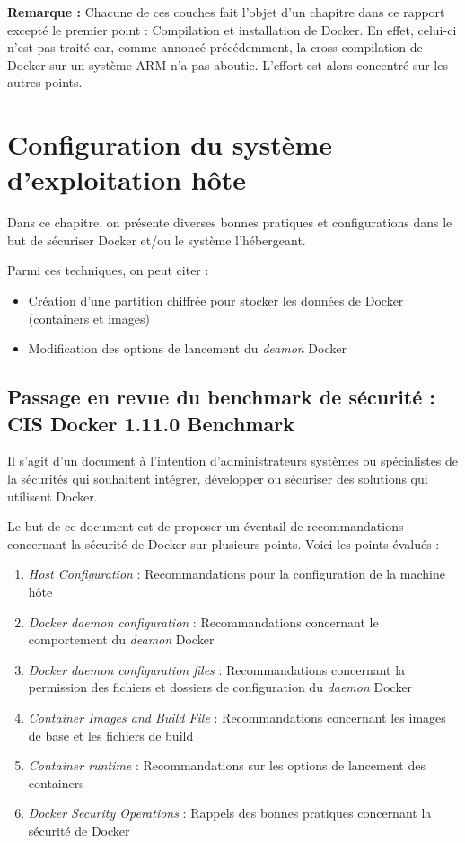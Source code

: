 \documentclass[11pt,a4paper,oneside]{report}
\begin{document}
\textbf{Remarque : } Chacune de ces couches fait l'objet d'un chapitre dans ce rapport excepté le premier point : Compilation et installation de Docker. En effet, celui-ci n'est pas traité car, comme annoncé précédemment, la cross compilation de Docker sur un système ARM n'a pas aboutie. L'effort est alors concentré sur les autres points.


\chapter{Configuration du système d'exploitation hôte}\label{config_systeme_os_hote}
Dans ce chapitre, on présente diverses bonnes pratiques et configurations dans le but de sécuriser Docker et/ou le système l'hébergeant.

Parmi ces techniques, on peut citer :

\begin{itemize}
\item Création d'une partition chiffrée pour stocker les données de Docker (containers et images)
\item Modification des options de lancement du \textit{deamon} Docker
\end{itemize}


\section{Passage en revue du benchmark de sécurité : CIS Docker 1.11.0 Benchmark}
Il s'agit d'un document à l'intention d'administrateurs systèmes ou spécialistes de la sécurités qui souhaitent intégrer, développer ou sécuriser des solutions qui utilisent Docker. 

Le but de ce document est de proposer un éventail de recommandations concernant la sécurité de Docker sur plusieurs points. Voici les points évalués :
\begin{enumerate}
\item \textit{Host Configuration} : Recommandations pour la configuration de la machine hôte
\item \textit{Docker daemon configuration} : Recommandations concernant le comportement du \textit{deamon} Docker
\item \textit{Docker daemon configuration files} : Recommandations concernant la permission des fichiers et dossiers de configuration du \textit{daemon} Docker
\item \textit{Container Images and Build File} : Recommandations concernant les images de base et les fichiers de build
\item \textit{Container runtime} : Recommandations sur les options de lancement des containers
\item \textit{Docker Security Operations} : Rappels des bonnes pratiques concernant la sécurité de Docker
\end{enumerate}
\end{document}
